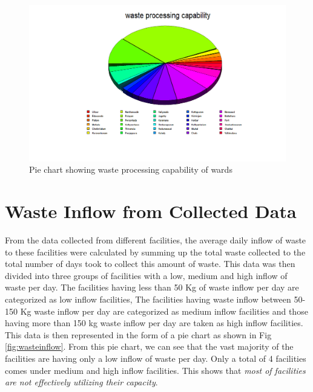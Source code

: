 \documentclass[12pt,a4paper]{report}
\begin{document}
\begin{figure}[H]
	\centering
	\includegraphics[width=1\linewidth]{waste_processing}
	\caption{Pie chart showing waste processing capability of wards}
	\label{fig:wasteprocessing}
\end{figure}

\section{Waste Inflow from Collected Data}

From the data collected from different facilities, the average daily inflow of waste to these facilities were calculated by summing up the total waste collected to the total number of days took to collect this amount of waste. This data was then divided into three groups of facilities with a low, medium and high inflow of waste per day. The facilities having less than 50 Kg of waste inflow per day are categorized as low inflow facilities, The facilities having waste inflow between 50-150 Kg waste inflow per day are categorized as medium inflow facilities and those having more than 150 kg waste inflow per day are taken as high inflow facilities. This data is then represented in  the form of a pie chart as shown in Fig \ref{fig:wasteinflow}. From this pie chart, we can see that the vast majority of the facilities are having only a low inflow of waste per day. Only a total of 4 facilities comes under medium and high inflow facilities. This shows that \textit{most of facilities are not effectively utilizing their capacity}. 
\end{document}
